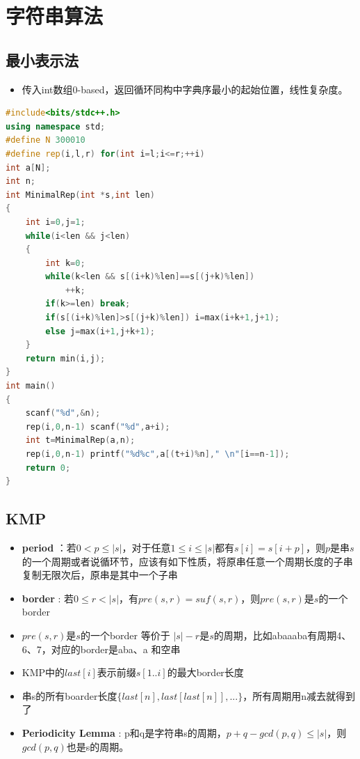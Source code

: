 \documentclass[UTF8,a4paper,titlepage]{ctexart}
\begin{document}
\section{字符串算法}
\subsection{最小表示法}
\begin{itemize}
\item 传入int数组0-based，返回循环同构中字典序最小的起始位置，线性复杂度。
\end{itemize}
\begin{lstlisting}[language=C++]
#include<bits/stdc++.h>
using namespace std;
#define N 300010
#define rep(i,l,r) for(int i=l;i<=r;++i)
int a[N];
int n;
int MinimalRep(int *s,int len)
{
    int i=0,j=1;
    while(i<len && j<len)
    {
        int k=0;
        while(k<len && s[(i+k)%len]==s[(j+k)%len])
            ++k;
        if(k>=len) break;
        if(s[(i+k)%len]>s[(j+k)%len]) i=max(i+k+1,j+1);
        else j=max(i+1,j+k+1);
    }
    return min(i,j);
}
int main()
{
    scanf("%d",&n);
    rep(i,0,n-1) scanf("%d",a+i);
    int t=MinimalRep(a,n);
    rep(i,0,n-1) printf("%d%c",a[(t+i)%n]," \n"[i==n-1]);
    return 0;
}
\end{lstlisting}
  \subsection{KMP}
\begin{itemize}
  \item \textbf{period} ：若$0<p\le \left|s\right|$，对于任意$1 \le i\le \left|s\right|$都有$s[i]=s[i+p]$，则$p$是串$s$的一个周期或者说循环节，应该有如下性质，将原串任意一个周期长度的子串复制无限次后，原串是其中一个子串
  \item \textbf{border} : 若$0\le r< \left|s\right|$，有$pre(s,r)=suf(s,r)$，则$pre(s,r)$是$s$的一个border
  \item $pre(s,r)$是$s$的一个border 等价于 $\left|s\right|-r$是$s$的周期，比如abaaaba有周期4、6、7，对应的border是aba、a 和空串
  \item KMP中的$last[i]$表示前缀$s[1..i]$的最大border长度
  \item 串s的所有boarder长度$\{last[n],last[last[n]],...\}$，所有周期用n减去就得到了
  \item \textbf{Periodicity Lemma} : p和q是字符串s的周期，$p+q-gcd(p,q)\le\left|s\right|$，则$gcd(p,q)$也是s的周期。
\end{itemize}
\end{document}
